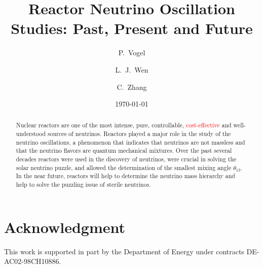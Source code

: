 \documentclass[aps,twocolumn,preprintnumbers,amsmath,superscriptaddress,amssymb,floats,nofootinbib]{revtex4-1}
\begin{document}
\title{Reactor Neutrino Oscillation Studies: Past, Present and Future}
\date{\today}
\author{P.~Vogel}
\author{L.~J.~Wen}
\author{C.~Zhang}


\begin{abstract}
Nuclear reactors are one of the most intense, pure, controllable, \textcolor{red}{cost-effective} and well-understood sources of neutrinos. Reactors played a major role in the study of the neutrino oscillations, a phenomenon that indicates that neutrinos are not massless and that the neutrino flavors are quantum mechanical mixtures. Over the past several decades reactors were used in the discovery of neutrinos, were crucial in solving the solar neutrino puzzle, and allowed the determination of the smallest mixing angle $\theta_{13}$. In the near future, reactors will help to determine the neutrino mass hierarchy and help to solve the puzzling issue of sterile neutrinos.
\end{abstract}

\maketitle
\thispagestyle{plain}










\section*{Acknowledgment}
This work is supported in part by the Department of Energy under contracts DE-AC02-98CH10886.



\end{document}
